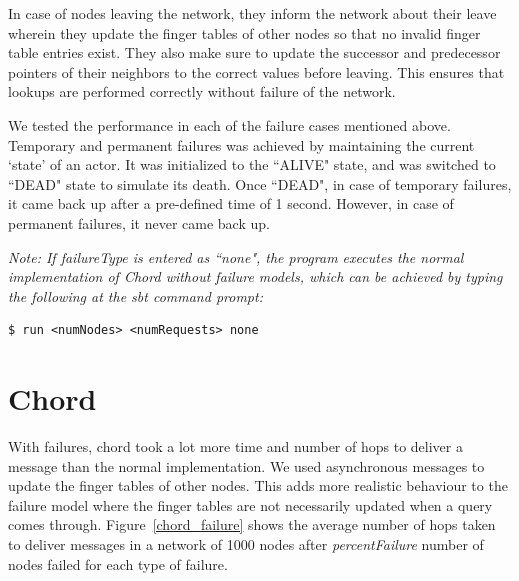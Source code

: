 \documentclass[11pt]{article}
\begin{document}
In case of nodes leaving the network, they inform the network about their leave wherein they update the finger tables of other nodes so that no invalid finger table entries exist. They also make sure to update the successor and predecessor pointers of their neighbors to the correct values before leaving. This ensures that lookups are performed correctly without failure of the network.

We tested the performance in each of the failure cases mentioned above. Temporary and permanent failures was achieved by maintaining the current `state' of an actor. It was initialized to the ``ALIVE" state, and was switched to ``DEAD" state to simulate its death. Once ``DEAD", in case of temporary failures, it came back up after a pre-defined time of 1 second. However, in case of permanent failures, it never came back up.

{\it Note: If failureType is entered as ``none", the program executes the normal implementation of Chord without failure models, which can be achieved by typing the following at the sbt command prompt:
\begin{lstlisting}
$ run <numNodes> <numRequests> none
\end{lstlisting}
}


\section{Chord}
With failures, chord took a lot more time and number of hops to deliver a message than the normal implementation. We used asynchronous messages to update the finger tables of other nodes. This adds more realistic behaviour to the failure model where the finger tables are not necessarily updated when a query comes through. Figure~\ref{chord_failure} shows the average number of hops taken to deliver messages in a network of 1000 nodes after {\it percentFailure} number of nodes failed for each type of failure.
\end{document}
